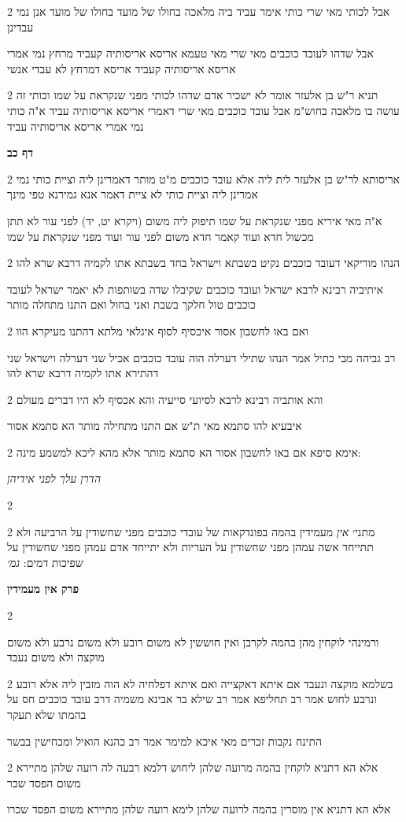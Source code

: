 \documentclass[12pt, openany]{book}
\newcommand{\sethebfont}{
\fontsize{10.5pt}{21.0pt} \selectfont
}
\newcommand{\twocol}[1]{
	{\sethebfont \begin{multicols}{2}
			#1
	\end{multicols}}	
}
\newcommand{\chapname}{}
\newcommand{\sectname}{}
\newcommand{\newchap}[1]{
	\addcontentsline{toc}{chapter}{#1}
	\renewcommand{\chapname}{#1}
		\begin{center}
			\textbf{%
\fontsize{16pt}{16pt}\selectfont
				#1}
		\end{center}
}
\newcommand{\newsection}[1]{
	\addcontentsline{toc}{section}{#1}
	\renewcommand{\sectname}{#1}	
	\vspace{-\baselineskip}
	\begin{center}
		\textbf{%
\fontsize{16pt}{16pt}\selectfont
			#1}
	\end{center}
	\vspace{-\baselineskip}
	\nopagebreak
}
\begin{document}
\twocol{אבל לכותי מאי שרי כותי אימר עביד ביה מלאכה בחולו של מועד בחולו של מועד אנן נמי עבדינן
\par אבל שדהו לעובד כוכבים מאי שרי מאי טעמא אריסא אריסותיה קעביד מרחץ נמי אמרי אריסא אריסותיה קעביד אריסא דמרחץ לא עבדי אנשי}
\twocol{תניא ר"ש בן אלעזר אומר לא ישכיר אדם שדהו לכותי מפני שנקראת על שמו וכותי זה עושה בו מלאכה בחוש"מ אבל עובד כוכבים מאי שרי דאמרי אריסא אריסותיה עביד א"ה כותי נמי אמרי אריסא אריסותיה עביד}
\newsection{דף כב}
\twocol{אריסותא לר"ש בן אלעזר לית ליה אלא עובד כוכבים מ"ט מותר דאמרינן ליה וציית כותי נמי אמרינן ליה וציית כותי לא ציית דאמר אנא גמירנא טפי מינך
\par א"ה מאי איריא מפני שנקראת על שמו תיפוק ליה משום (ויקרא יט, יד) לפני עור לא תתן מכשול חדא ועוד קאמר חדא משום לפני עור ועוד מפני שנקראת על שמו}
\twocol{הנהו מוריקאי דעובד כוכבים נקיט בשבתא וישראל בחד בשבתא אתו לקמיה דרבא שרא להו
\par איתיביה רבינא לרבא ישראל ועובד כוכבים שקיבלו שדה בשותפות לא יאמר ישראל לעובד כוכבים טול חלקך בשבת ואני בחול ואם התנו מתחלה מותר}
\twocol{ואם באו לחשבון אסור איכסיף לסוף איגלאי מלתא דהתנו מעיקרא הוו
\par רב גביהה מבי כתיל אמר הנהו שתילי דערלה הוה עובד כוכבים אכיל שני דערלה וישראל שני דהתירא אתו לקמיה דרבא שרא להו}
\twocol{והא אותביה רבינא לרבא לסיועי סייעיה והא אכסיף לא היו דברים מעולם
\par איבעיא להו סתמא מאי ת"ש אם התנו מתחילה מותר הא סתמא אסור}
\twocol{אימא סיפא אם באו לחשבון אסור הא סתמא מותר אלא מהא ליכא למשמע מינה:
\par \par \par {\large\emph{הדרן עלך לפני אידיהן}}\par \par }
\twocol{
\par }
\twocol{מתני׳ {\large\emph{אין}} מעמידין בהמה בפונדקאות של עובדי כוכבים מפני שחשודין על הרביעה ולא תתייחד אשה עמהן מפני שחשודין על העריות ולא יתייחד אדם עמהן מפני שחשודין על שפיכות דמים: {\large\emph{גמ׳}} }
\newchap{פרק \quad אין מעמידין}
\twocol{
\par ורמינהי לוקחין מהן בהמה לקרבן ואין חוששין לא משום רובע ולא משום נרבע ולא משום מוקצה ולא משום נעבד}
\twocol{בשלמא מוקצה ונעבד אם איתא דאקצייה ואם איתא דפלחיה לא הוה מזבין ליה אלא רובע ונרבע לחוש אמר רב תחליפא אמר רב שילא בר אבינא משמיה דרב עובד כוכבים חס על בהמתו שלא תעקר
\par התינח נקבות זכרים מאי איכא למימר אמר רב כהנא הואיל ומכחישין בבשר}
\twocol{אלא הא דתניא לוקחין בהמה מרועה שלהן ליחוש דלמא רבעה לה רועה שלהן מתיירא משום הפסד שכר
\par אלא הא דתניא אין מוסרין בהמה לרועה שלהן לימא רועה שלהן מתיירא משום הפסד שכרו}
\end{document}
